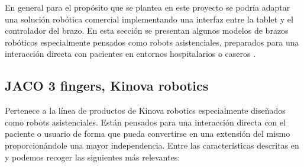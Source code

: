 	En general para el propósito que se plantea en este proyecto se podría adaptar una solución robótica comercial implementando una interfaz entre la tablet y el controlador del brazo. En esta sección se presentan algunos modelos de brazos robóticos especialmente pensados como robots asistenciales, preparados para una interacción directa con pacientes en entornos hospitalarios o caseros .

 \subsection{JACO 3 fingers, Kinova robotics}
	 Pertenece a la línea de productos de Kinova robotics especialmente diseñados como robots asistenciales. Están pensados para una interacción directa con el paciente o usuario de forma que pueda convertirse en una extensión del mismo proporcionándole una mayor independencia. Entre las características descritas en \cite{Jaco:2018} y \cite{JacoWeb:2018} podemos recoger las siguientes más relevantes:
     \\

